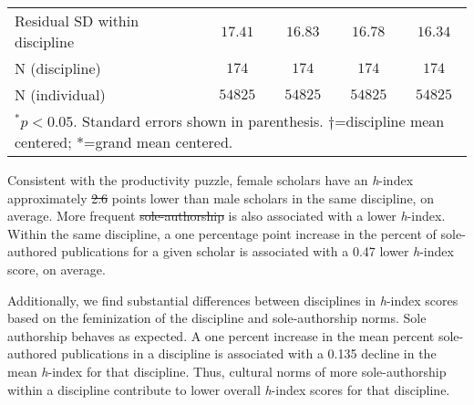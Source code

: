 \documentclass[
  10pt,
  letterpaper,
]{article}
\providecommand{\DIFaddtex}[1]{{\protect\color{blue}\uwave{#1}}} %
\providecommand{\DIFdeltex}[1]{{\protect\color{red}\sout{#1}}}                      %
\providecommand{\DIFaddbegin}{} %
\providecommand{\DIFaddend}{} %
\providecommand{\DIFdelbegin}{} %
\providecommand{\DIFdelend}{} %
\providecommand{\DIFaddendFL}{} %
\providecommand{\DIFadd}[1]{\texorpdfstring{\DIFaddtex{#1}}{#1}} %
\providecommand{\DIFdel}[1]{\texorpdfstring{\DIFdeltex{#1}}{}} %
\newcommand{\DIFscaledelfig}{0.5}
\newlength{\DIFdelgraphicswidth} %
\newlength{\DIFdelgraphicsheight} %
\newcommand{\DIFaddincludegraphics}[2][]{{\color{blue}\fbox{\DIFOincludegraphics[#1]{#2}}}} %
\newcommand{\DIFdelincludegraphics}[2][]{%
\sbox{\DIFdelgraphicsbox}{\DIFOincludegraphics[#1]{#2}}%
\settoboxwidth{\DIFdelgraphicswidth}{\DIFdelgraphicsbox} %
\settoboxtotalheight{\DIFdelgraphicsheight}{\DIFdelgraphicsbox} %
\scalebox{\DIFscaledelfig}{%
\parbox[b]{\DIFdelgraphicswidth}{\usebox{\DIFdelgraphicsbox}\\[-\baselineskip] \rule{\DIFdelgraphicswidth}{0em}}\llap{\resizebox{\DIFdelgraphicswidth}{\DIFdelgraphicsheight}{%
\setlength{\unitlength}{\DIFdelgraphicswidth}%
\begin{picture}(1,1)%
\thicklines\linethickness{2pt} %
{\color[rgb]{1,0,0}\put(0,0){\framebox(1,1){}}}%
{\color[rgb]{1,0,0}\put(0,0){\line( 1,1){1}}}%
{\color[rgb]{1,0,0}\put(0,1){\line(1,-1){1}}}%
\end{picture}%
}\hspace*{3pt}}} %
} %
\DeclareRobustCommand{\DIFaddbegin}{\DIFOaddbegin \let\includegraphics\DIFaddincludegraphics} %
\DeclareRobustCommand{\DIFaddend}{\DIFOaddend \let\includegraphics\DIFOincludegraphics} %
\DeclareRobustCommand{\DIFdelbegin}{\DIFOdelbegin \let\includegraphics\DIFdelincludegraphics} %
\DeclareRobustCommand{\DIFdelend}{\DIFOaddend \let\includegraphics\DIFOincludegraphics} %
\DeclareRobustCommand{\DIFaddendFL}{\DIFOaddendFL \let\includegraphics\DIFOincludegraphics} %
\begin{document}
\begin{table}
{\begin{center}
\begin{tabular}{l c c c c}
Residual SD within discipline           & $17.41$     & $16.83$      & $16.78$      & $16.34$      \\
N (discipline)                          & $174$       & $174$        & $174$        & $174$        \\
N (individual)                          & $54825$     & $54825$      & $54825$      & $54825$      \\
\hline
\multicolumn{5}{l}{\scriptsize{$^{*}p<0.05$. Standard errors shown in parenthesis. $\dagger$=discipline mean centered; *=grand mean centered.}}
\end{tabular}
\label{table:coefficients}
\end{center}

}

\DIFaddendFL \end{table}%

Consistent with the productivity puzzle, female scholars have an
\emph{h}-index approximately \DIFdelbegin \DIFdel{2.6 }\DIFdelend \DIFaddbegin \DIFadd{2.63 }\DIFaddend points lower than male scholars in the
same discipline, on average. More frequent \DIFdelbegin \DIFdel{sole-authorship }\DIFdelend \DIFaddbegin \DIFadd{sole authorship }\DIFaddend is also
associated with a lower \emph{h}-index. Within the same discipline, a
one percentage point increase in the percent of sole-authored
publications for a given scholar is associated with a 0.47 lower
\emph{h}-index score, on average.

Additionally, we find substantial differences between disciplines in
\emph{h}-index scores based on the feminization of the discipline and
sole-authorship norms. Sole authorship behaves as expected. A one
percent increase in the mean percent sole-authored publications in a
discipline is associated with a 0.135 decline in the mean \emph{h}-index
for that discipline. Thus, cultural norms of more sole-authorship within
a discipline contribute to lower overall \emph{h}-index scores for that
discipline.
\end{document}
